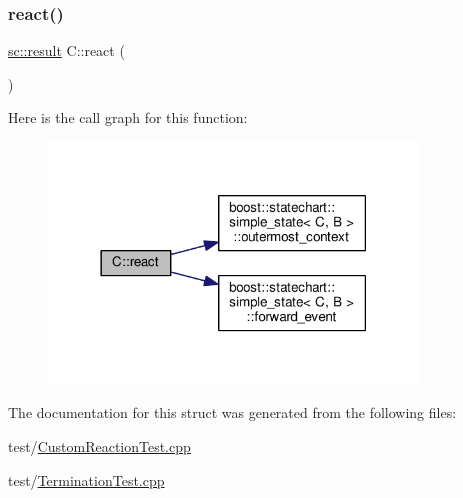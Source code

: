 \subsubsection{\texorpdfstring{react()}{react()}\hspace{0.1cm}{\footnotesize\ttfamily [3/3]}}
{\footnotesize\ttfamily \mbox{\hyperlink{namespaceboost_1_1statechart_abe807f6598b614d6d87bb951ecd92331}{sc\+::result}} C\+::react (\begin{DoxyParamCaption}\item[{const \mbox{\hyperlink{struct_ev_discard_in_d}{Ev\+Discard\+InD}} \&}]{ }\end{DoxyParamCaption})\hspace{0.3cm}{\ttfamily [inline]}}

Here is the call graph for this function\+:
\nopagebreak
\begin{figure}[H]
\begin{center}
\leavevmode
\includegraphics[width=278pt]{struct_c_ab564da3e047d017f15645aa4682ae8f3_cgraph}
\end{center}
\end{figure}


The documentation for this struct was generated from the following files\+:\begin{DoxyCompactItemize}
\item 
test/\mbox{\hyperlink{_custom_reaction_test_8cpp}{Custom\+Reaction\+Test.\+cpp}}\item 
test/\mbox{\hyperlink{_termination_test_8cpp}{Termination\+Test.\+cpp}}\end{DoxyCompactItemize}
